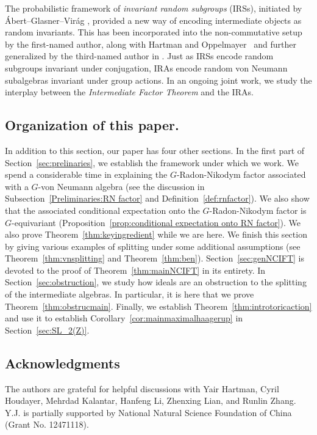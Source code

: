 \documentclass[12pt]{amsart}
\theoremstyle{definition}
\begin{document}
The probabilistic framework of \textit{invariant random subgroups} (IRSs), initiated by Ábert--Glasner--Virág \cite{abert2014kesten}, provided a new way of encoding intermediate objects as random invariants. This has been incorporated into the non-commutative setup by the first-named author, along with Hartman and Oppelmayer~\cite{amrutam2025amenable} and further generalized by the third-named author in \cite{zhou2024noncommutative}.  Just as IRSs encode random subgroups invariant under conjugation, IRAs encode random von Neumann subalgebras invariant under group actions. In an ongoing joint work, we study the interplay between the \textit{Intermediate Factor Theorem} and the IRAs.  
\subsection*{Organization of this paper.}In addition to this section, our paper has four other sections. In the first part of Section~\ref{sec:prelinaries}, we establish the framework under which we work. We spend a considerable time in explaining the $G$-Radon-Nikodym factor associated with a $G$-von Neumann algebra (see the discussion in Subsection~\ref{Preliminaries:RN factor} and Definition~\ref{def:rnfactor}). We also show that the associated conditional expectation onto the $G$-Radon-Nikodym factor is $G$-equivariant (Proposition~\ref{prop:conditional expectation onto RN factor}). We also prove Theorem~\ref{thm:keyingredient} while we are here. We finish this section by giving various examples of splitting under some additional assumptions (see Theorem~\ref{thm:vnsplitting} and Theorem~\ref{thm:ben}). Section~\ref{sec:genNCIFT} is devoted to the proof of Theorem~\ref{thm:mainNCIFT} in its entirety. In Section~\ref{sec:obstruction}, we study how ideals are an obstruction to the splitting of the intermediate algebras. In particular, it is here that we prove Theorem~\ref{thm:obstrucmain}. Finally, we establish Theorem~\ref{thm:introtoricaction} and use it to establish Corollary~\ref{cor:mainmaximalhaagerup} in Section~\ref{sec:SL_2(Z)}.

\subsection*{Acknowledgments}  The authors are grateful for helpful discussions with Yair Hartman, Cyril Houdayer, Mehrdad Kalantar, Hanfeng Li, Zhenxing Lian, and Runlin Zhang.
Y.J. is partially supported by National Natural Science Foundation of
 China (Grant No. 12471118).
\end{document}
